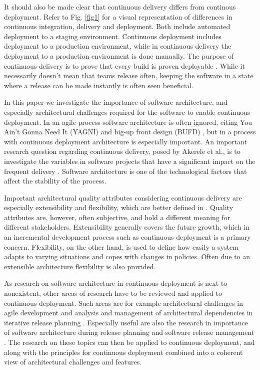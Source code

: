 \documentclass[conference]{IEEEtran}
\begin{document}
It should also be made clear that continuous delivery differs from continous deployment. Refer to Fig. \ref{fig1} for a visual representation of differences in continuous integration, delivery and deployment. Both include automated deployment to a staging environment. Continuous deployment includes deployment to a production environment, while in continuous delivery the deployment to a production environment is done manually. The purpose of continuous delivery is to prove that every build is proven deployable \cite{cdbook}. While it necessarily doesn't mean that teams release often, keeping the software in a state where a release can be made instantly is often seen beneficial.

In this paper we investigate the importance of software architecture, and especially architectural challenges required for the software to enable continuous deployment. In an agile process software architecture is often ignored, citing You Ain't Gonna Need It (YAGNI) and big-up front design (BUFD) \cite{kruchten2010software}, but in a process with continuous deployment architecture is especially important. An important research question regarding continuous delivery, posed by Akerele et al., is to investigate the variables in software projects that have a significant impact on the frequent delivery \cite{6612879}. Software architecture is one of the technological factors that affect the stability of the process. 

Important architectural quality attributes considering continuous delivery are especially extensibility and flexibility, which are better defined in \cite{kaisler2005software}. Quality attributes are, however, often subjective, and hold a different meaning for different stakeholders. Extensibility generally covers the future growth, which in an incremental development process such as continuous deployment is a primary concern. Flexibility, on the other hand, is used to define how easily a system adapts to varying situations and copes with changes in policies. Often due to an extensible architecture flexibility is also provided. 

As research on software architecture in continuous deployment is next to nonexistent, other areas of research have to be reviewed and applied to continuous deployment. Such areas are for example architectural challenges in agile development \cite{kruchten2010software} and analysis and management of architectural dependencies in iterative release planning \cite{brown2011analysis}. Especially useful are also the research in importance of software architecture during release planning \cite{lindgren2008importance} and software release management \cite{van1997software}.
The research on these topics can then be applied to continuous deployment, and along with the principles for continuous deployment \cite{humble2006deployment} combined into a coherent view of architectural challenges and features. 
\end{document}
